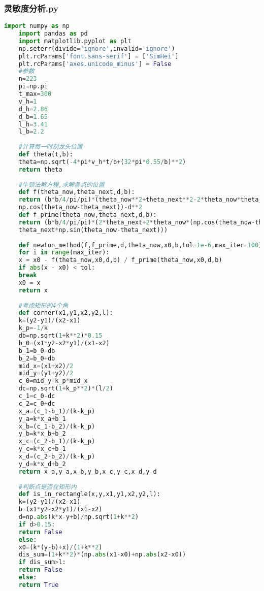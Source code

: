 \documentclass[withoutpreface,bwprint]{cumcmthesis} %
\begin{document}
	\subsubsection*{灵敏度分析.py}
	\begin{lstlisting}[language=Python]
	import numpy as np
	import pandas as pd
	import matplotlib.pyplot as plt
	np.seterr(divide='ignore',invalid='ignore')
	plt.rcParams['font.sans-serif'] = ['SimHei']
	plt.rcParams['axes.unicode_minus'] = False
	#参数
	n=223
	pi=np.pi
	t_max=300
	v_h=1
	d_h=2.86
	d_b=1.65
	l_h=3.41
	l_b=2.2
	
	#计算每一时刻龙头位置
	def theta(t,b):
	theta=np.sqrt(-4*pi*v_h*t/b+(32*pi*0.55/b)**2)
	return theta
	
	#牛顿法解方程,求解各点的位置
	def f(theta_now,theta_next,d,b):
	return (b*b/4/pi/pi)*(theta_now**2+theta_next**2-2*theta_now*theta_next*
	np.cos(theta_now-theta_next))-d**2
	def f_prime(theta_now,theta_next,d,b):
	return (b*b/4/pi/pi)*(2*theta_next+2*theta_now*(np.cos(theta_now-theta_next)-
	theta_next*np.sin(theta_now-theta_next)))
	
	def newton_method(f,f_prime,d,theta_now,x0,b,tol=1e-6,max_iter=100):
	for i in range(max_iter):
	x = x0 - f(theta_now,x0,d,b) / f_prime(theta_now,x0,d,b)
	if abs(x - x0) < tol:
	break
	x0 = x
	return x    
	
	#考虑矩形的4个角
	def corner(x1,y1,x2,y2,l):
	k=(y2-y1)/(x2-x1)
	k_p=-1/k
	db=np.sqrt(1+k**2)*0.15
	b_0=(x1*y2-x2*y1)/(x1-x2)
	b_1=b_0-db
	b_2=b_0+db
	mid_x=(x1+x2)/2
	mid_y=(y1+y2)/2
	c_0=mid_y-k_p*mid_x
	dc=np.sqrt(1+k_p**2)*(l/2)
	c_1=c_0-dc
	c_2=c_0+dc
	x_a=(c_1-b_1)/(k-k_p)
	y_a=k*x_a+b_1
	x_b=(c_1-b_2)/(k-k_p)
	y_b=k*x_b+b_2
	x_c=(c_2-b_1)/(k-k_p)
	y_c=k*x_c+b_1
	x_d=(c_2-b_2)/(k-k_p)
	y_d=k*x_d+b_2
	return x_a,y_a,x_b,y_b,x_c,y_c,x_d,y_d
	
	#判断点是否在矩形内
	def is_in_rectangle(x,y,x1,y1,x2,y2,l):
	k=(y2-y1)/(x2-x1)
	b=(x1*y2-x2*y1)/(x1-x2)
	d=np.abs(k*x-y+b)/np.sqrt(1+k**2)
	if d>0.15:
	return False
	else:
	x0=(k*(y-b)+x)/(1+k**2)
	dis_sum=(1+k**2)*(np.abs(x1-x0)+np.abs(x2-x0))
	if dis_sum>l:
	return False
	else:
	return True
	

\end{lstlisting}
\end{document}
